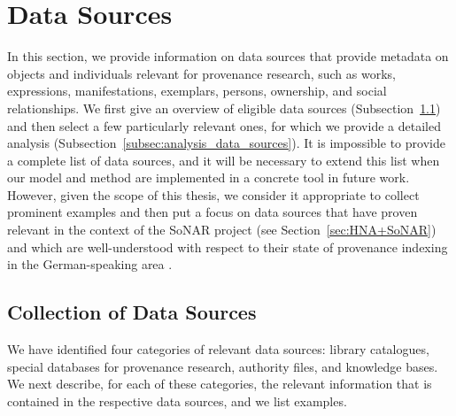 \section{Data Sources}
\label{sec:data_sources}

In this section, we provide information on data sources
that provide metadata on objects and individuals
relevant for provenance research, such as works, expressions, manifestations, exemplars,
persons, ownership, and social relationships.
We first give an overview of eligible data sources (Subsection~\ref{subsec:collection_data_sources})
and then select a few particularly relevant ones, for which we provide a detailed analysis
(Subsection~\ref{subsec:analysis_data_sources}).
It is impossible to provide a complete list of data sources,
and it will be necessary to extend this list when 
our model and method are implemented in a concrete tool in future work.
However, given the scope of this thesis, we consider it appropriate to 
collect prominent examples and then
put a focus
on data sources that have proven relevant in the context of the \gls{SoNAR} project (see Section~\ref{sec:HNA+SoNAR})
and which are well-understood with respect to their state of provenance indexing
in the German-speaking area \autocite[cf.][]{Hakelberg2016}.

\subsection{Collection of Data Sources}
\label{subsec:collection_data_sources}

We have identified four categories of relevant data sources:
library catalogues, special databases for provenance research, authority files, and knowledge bases.
We next describe, for each of these categories, the relevant information that is
contained in the respective data sources, and we list examples.

